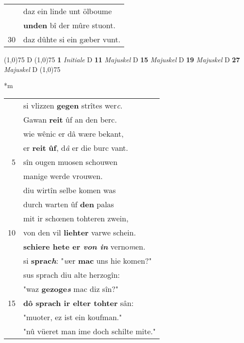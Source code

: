 \documentclass[8pt,a4paper,notitlepage]{article}
\begin{document}
\begin{table}[ht]
\begin{minipage}[t]{0.5\linewidth}
\begin{tabular}{rl}
 & daz ein linde unt ölboume\\ 
 & \textbf{unden} bî der mûre stuont.\\ 
30 & daz dûhte si ein gæber vunt.\\ 
\end{tabular}
\scriptsize
\line(1,0){75} \newline
D \newline
\line(1,0){75} \newline
\textbf{1} \textit{Initiale} D  \textbf{11} \textit{Majuskel} D  \textbf{15} \textit{Majuskel} D  \textbf{19} \textit{Majuskel} D  \textbf{27} \textit{Majuskel} D  \newline
\line(1,0){75} \newline
\newline
\end{minipage}
\hspace{0.5cm}
\begin{minipage}[t]{0.5\linewidth}
\small
\begin{center}*m
\end{center}
\begin{tabular}{rl}
 & si vlizzen \textbf{gegen} strîtes wer\textit{c}.\\ 
 & Gawan \textbf{reit} ûf an den berc.\\ 
 & wie wênic er dâ wære bekant,\\ 
 & er \textbf{reit} \textbf{ûf}, d\textit{â} er die burc vant.\\ 
5 & sîn ougen muosen schouwen\\ 
 & manige werde vrouwen.\\ 
 & diu wirtîn selbe komen was\\ 
 & durch warten ûf \textbf{den} palas\\ 
 & mit ir schœnen tohteren zwein,\\ 
10 & von den vil \textbf{liehter} varwe schein.\\ 
 & \textbf{schiere hete er \textit{von in}} verno\textit{m}en.\\ 
 & si \textbf{sprac\textit{h}}: "\textit{w}er \textbf{mac} uns hie komen?"\\ 
 & sus sprach diu alte herzogîn:\\ 
 & "waz \textbf{gezoge\textit{s}} mac diz sîn?"\\ 
15 & \textbf{dô sprach ir elter tohter} sân:\\ 
 & "muoter, ez ist ein koufman."\\ 
 & "nû vüeret man ime doch schilte mite."\\ 

\end{tabular}
\end{minipage}
\end{table}
\end{document}
